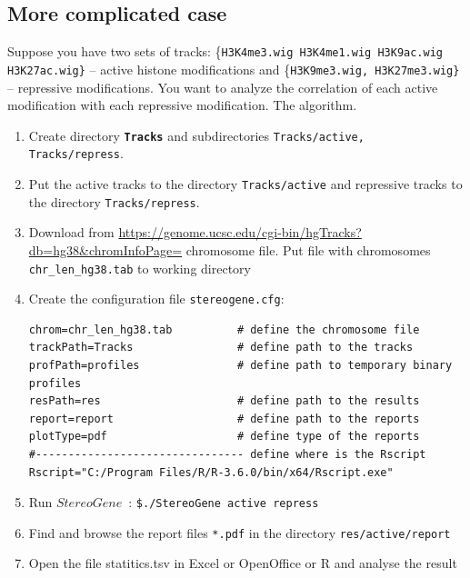 \documentclass{article}
\newcommand{\prm}[1]{\texttt{\textbf{{#1}}}}
\newcommand{\pr}[1]{\texttt{{#1}}}
\newcommand{\sg}{$StereoGene$\ }
\begin{document}
\subsection{More complicated case}\label{case2}
Suppose you have two sets of tracks: \{\pr{H3K4me3.wig H3K4me1.wig H3K9ac.wig H3K27ac.wig\}} -- active histone modifications and \{\pr{H3K9me3.wig, H3K27me3.wig\}} -- repressive modifications. You want to analyze the correlation of each active modification with each repressive modification. The algorithm.
\begin{enumerate}
\item Create directory \prm{Tracks} and subdirectories \pr{Tracks/active, Tracks/repress}.
\item Put the active tracks to the directory \pr{Tracks/active} and repressive tracks to the directory \pr{Tracks/repress}.
\item Download from \url{https://genome.ucsc.edu/cgi-bin/hgTracks?db=hg38&chromInfoPage=} chromosome file. Put file with chromosomes \pr{chr\_len\_hg38.tab} to working directory
\item Create the configuration file \pr{stereogene.cfg}:

\begin{shaded} 
\begin{verbatim}
chrom=chr_len_hg38.tab          # define the chromosome file
trackPath=Tracks                # define path to the tracks
profPath=profiles               # define path to temporary binary profiles
resPath=res                     # define path to the results
report=report                   # define path to the reports
plotType=pdf                    # define type of the reports
#-------------------------------- define where is the Rscript 
Rscript="C:/Program Files/R/R-3.6.0/bin/x64/Rscript.exe"
\end{verbatim}
\end{shaded}


\item Run \sg: 
\pr{\$./StereoGene active repress}
\item Find and browse the report files \pr{*.pdf} in the directory \pr{res/active/report}
\item Open the file statitics.tsv in Excel or OpenOffice or R and analyse the result
\end{enumerate}
\end{document}
